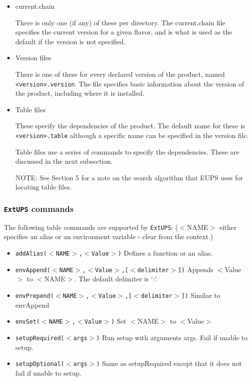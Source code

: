 \documentclass{article}
\newcommand{\code}[1]{\texttt{#1}}
\newcommand{\eups}{\code{ExtUPS}}
\begin{document}
\begin{itemize}
  \item current.chain

    There is only one (if any) of these per directory.  The
    current.chain file specifies the current version for a given
    flavor, and is what is used as the default if the version is not
    specified.

  \item Version files

    There is one of these for every declared version of the product,
    named \texttt{<version>.version}. The file specifies basic information
    about the version of the product, including where it is installed.

  \item Table files

    These specify the dependencies of the product. The default name
    for these is \texttt{<version>.table} although a specific name can be specified in the
    version file.

    Table files use a series of commands to specify the dependencies. These are
    discussed in the next subsection.

    NOTE: See Section 5 for a note on the search algorithm that EUPS uses for 
    locating table files.
\end{itemize}

\subsubsection{\eups{} commands}

The following table commands are supported by \eups{}: ($<$NAME$>$ either specifies an
alias or an environment variable - clear from the context.)

\begin{itemize}
   \item \texttt{addAlias($<$NAME$>$,$<$Value$>$)}
     Defines a function or an alias.
    
   \item \texttt{envAppend($<$NAME$>$,$<$Value$>$,[$<$delimiter$>$])}
     Appends $<$Value$>$ to $<$NAME$>$. The default delimiter is `:'.
     
   \item \texttt{envPrepend($<$NAME$>$,$<$Value$>$,[$<$delimiter$>$])}
     Similar to envAppend
     
   \item \texttt{envSet($<$NAME$>$,$<$Value$>$)}
     Set $<$NAME$>$ to $<$Value$>$
     
   \item \texttt{setupRequired($<$args$>$)}
     Run setup with arguments args. Fail if unable to setup.
     
   \item \texttt{setupOptional($<$args$>$)}
     Same as setupRequired except that it does not fail if unable to setup.
\end{itemize}
\end{document}
